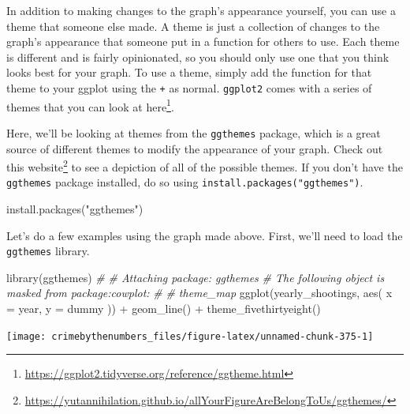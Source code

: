 \documentclass[
  a4paper,
]{krantz}
\makeatletter
\newenvironment{Shaded}{\begin{snugshade}}{\end{snugshade}}
\newcommand{\AttributeTok}[1]{\textcolor[rgb]{0.61,0.61,0.61}{#1}}
\newcommand{\CommentTok}[1]{\textcolor[rgb]{0.37,0.37,0.37}{\textit{#1}}}
\newcommand{\FunctionTok}[1]{\textcolor[rgb]{0,0,0}{#1}}
\newcommand{\NormalTok}[1]{#1}
\newcommand{\SpecialCharTok}[1]{\textcolor[rgb]{0,0,0}{#1}}
\newcommand{\StringTok}[1]{\textcolor[rgb]{0.5,0.5,0.5}{#1}}
\renewcommand{\href}[2]{#2\footnote{\url{#1}}}
\newenvironment{kframe}{%
\medskip{}
\setlength{\fboxsep}{.8em}
 \def\at@end@of@kframe{}%
 \ifinner\ifhmode%
  \def\at@end@of@kframe{\end{minipage}}%
  \begin{minipage}{\columnwidth}%
 \fi\fi%
 \def\FrameCommand##1{\hskip\@totalleftmargin \hskip-\fboxsep
 \colorbox{shadecolor}{##1}\hskip-\fboxsep
     \hskip-\linewidth \hskip-\@totalleftmargin \hskip\columnwidth}%
 \MakeFramed {\advance\hsize-\width
   \@totalleftmargin\z@ \linewidth\hsize
   \@setminipage}}%
 {\par\unskip\endMakeFramed%
 \at@end@of@kframe}
\renewenvironment{Shaded}{\begin{kframe}}{\end{kframe}}
\makeatother
\begin{document}
In addition to making changes to the graph's appearance
yourself, you can use a theme that someone else made. A
theme is just a collection of changes to the graph's
appearance that someone put in a function for others to use.
Each theme is different and is fairly opinionated, so you
should only use one that you think looks best for your
graph. To use a theme, simply add the function for that
theme to your ggplot using the \texttt{+} as normal.
\texttt{ggplot2} comes with a series of themes that you can
look at
\href{https://ggplot2.tidyverse.org/reference/ggtheme.html}{here}.

Here, we'll be looking at themes from the \texttt{ggthemes}
package, which is a great source of different themes to
modify the appearance of your graph. Check out this
\href{https://yutannihilation.github.io/allYourFigureAreBelongToUs/ggthemes/}{website}
to see a depiction of all of the possible themes. If you
don't have the \texttt{ggthemes} package installed, do so
using \texttt{install.packages("ggthemes")}.

\begin{Shaded}
\begin{Highlighting}[]
\FunctionTok{install.packages}\NormalTok{(}\StringTok{"ggthemes"}\NormalTok{)}
\end{Highlighting}
\end{Shaded}

Let's do a few examples using the graph made above. First,
we'll need to load the \texttt{ggthemes} library.

\begin{Shaded}
\begin{Highlighting}[]
\FunctionTok{library}\NormalTok{(ggthemes)}
\CommentTok{\# }
\CommentTok{\# Attaching package: \textquotesingle{}ggthemes\textquotesingle{}}
\CommentTok{\# The following object is masked from \textquotesingle{}package:cowplot\textquotesingle{}:}
\CommentTok{\# }
\CommentTok{\#     theme\_map}
\FunctionTok{ggplot}\NormalTok{(yearly\_shootings, }\FunctionTok{aes}\NormalTok{(}
  \AttributeTok{x =}\NormalTok{ year,}
  \AttributeTok{y =}\NormalTok{ dummy}
\NormalTok{)) }\SpecialCharTok{+}
  \FunctionTok{geom\_line}\NormalTok{() }\SpecialCharTok{+}
  \FunctionTok{theme\_fivethirtyeight}\NormalTok{()}
\end{Highlighting}
\end{Shaded}

\begin{center}\texttt{[image: crimebythenumbers\_files/figure-latex/unnamed-chunk-375-1]} \end{center}
\end{document}

